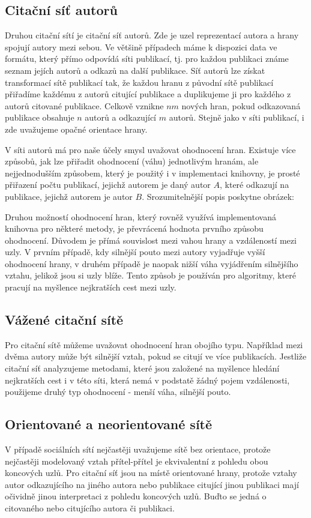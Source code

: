 \documentclass[12pt,titlepage]{report}
\begin{document}
\subsection{Citační síť autorů}
Druhou citační sítí je citační síť autorů. Zde je uzel reprezentací autora a
hrany spojují autory mezi sebou. Ve většině případech máme k dispozici data ve
formátu, který přímo odpovídá síti publikací, tj. pro každou publikaci známe
seznam jejích autorů a odkazů na další publikace. Síť autorů lze získat
transformací sítě publikací tak, že každou hranu z původní sítě publikací
přiřadíme každému z autorů citující publikace a duplikujeme ji pro každého z
autorů citované publikace. Celkově vznikne $nm$ nových hran, pokud odkazovaná
publikace obsahuje $n$ autorů a odkazující $m$ autorů. Stejně jako v síti
publikací, i zde uvažujeme opačné orientace hrany.

V síti autorů má pro naše účely smysl uvažovat ohodnocení hran. Existuje více
způsobů, jak lze přiřadit ohodnocení (váhu) jednotlivým hranám, ale
nejjednodušším způsobem, který je použitý i v implementaci knihovny, je prosté
přiřazení počtu publikací, jejichž autorem je daný autor $A$, které odkazují na
publikace, jejichž autorem je autor $B$. Srozumitelnější popis poskytne
obrázek:

Druhou možností ohodnocení hran, který rovněž využívá implementovaná knihovna
pro některé metody, je převrácená hodnota prvního způsobu ohodnocení. Důvodem
je přímá souvislost mezi vahou hrany a vzdáleností mezi uzly. V prvním případě,
kdy silnější pouto mezi autory vyjadřuje vyšší ohodnocení hrany, v druhém
případě je naopak nižší váha vyjádřením silnějšího vztahu, jelikož jsou si uzly
blíže. Tento způsob je používán pro algoritmy, které pracují na myšlence
nejkratších cest mezi uzly. 

\subsection{Vážené citační sítě}
Pro citační sítě můžeme uvažovat ohodnocení hran obojího typu. Například mezi
dvěma autory může být silnější vztah, pokud se citují ve více publikacích.
Jestliže citační síť analyzujeme metodami, které jsou založené na myšlence
hledání nejkratších cest i v této síti, která nemá v podstatě žádný pojem
vzdálenosti, použijeme druhý typ ohodnocení - menší váha, silnější pouto.


\subsection{Orientované a neorientované sítě}
V případě sociálních sítí nejčastěji uvažujeme sítě bez orientace, protože
nejčastěji modelovaný vztah přítel-přítel je ekvivalentní z pohledu obou
koncových uzlů. Pro citační síť jsou na místě orientované hrany, protože vztahy
autor odkazujícího na jiného autora nebo publikace citující jinou publikaci
mají očividně jinou interpretaci z pohledu koncových uzlů. Buďto se jedná o
citovaného nebo citujícího autora či publikaci.
\end{document}
